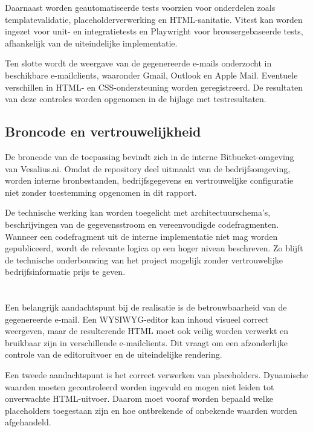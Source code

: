 Daarnaast worden geautomatiseerde tests voorzien voor onderdelen zoals
templatevalidatie, placeholderverwerking en HTML-sanitatie. Vitest kan
worden ingezet voor unit- en integratietests en Playwright voor
browsergebaseerde tests, afhankelijk van de uiteindelijke implementatie.

Ten slotte wordt de weergave van de gegenereerde e-mails onderzocht in
beschikbare e-mailclients, waaronder Gmail, Outlook en Apple Mail. Eventuele
verschillen in HTML- en CSS-ondersteuning worden geregistreerd. De resultaten
van deze controles worden opgenomen in de bijlage met testresultaten.

\subsection{Broncode en vertrouwelijkheid}
De broncode van de toepassing bevindt zich in de interne Bitbucket-omgeving
van Vesalius.ai. Omdat de repository deel uitmaakt van de bedrijfsomgeving,
worden interne bronbestanden, bedrijfsgegevens en vertrouwelijke configuratie
niet zonder toestemming opgenomen in dit rapport.

De technische werking kan worden toegelicht met architectuurschema's,
beschrijvingen van de gegevensstroom en vereenvoudigde codefragmenten.
Wanneer een codefragment uit de interne implementatie niet mag worden
gepubliceerd, wordt de relevante logica op een hoger niveau beschreven.
Zo blijft de technische onderbouwing van het project mogelijk zonder
vertrouwelijke bedrijfsinformatie prijs te geven.

\section{}%
\label{sec:problemen}
Een belangrijk aandachtspunt bij de realisatie is de betrouwbaarheid van de
gegenereerde e-mail. Een WYSIWYG-editor kan inhoud visueel correct weergeven,
maar de resulterende HTML moet ook veilig worden verwerkt en bruikbaar zijn
in verschillende e-mailclients. Dit vraagt om een afzonderlijke controle van
de editoruitvoer en de uiteindelijke rendering.

Een tweede aandachtspunt is het correct verwerken van placeholders. Dynamische
waarden moeten gecontroleerd worden ingevuld en mogen niet leiden tot
onverwachte HTML-uitvoer. Daarom moet vooraf worden bepaald welke placeholders
toegestaan zijn en hoe ontbrekende of onbekende waarden worden afgehandeld.


